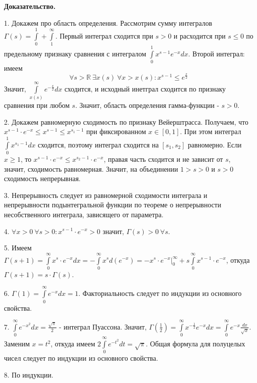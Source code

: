\textbf{Доказательство.}

1. Докажем про область определения. Рассмотрим сумму интегралов
$\Gamma(s)=\int\limits_{0}^{1}+\int\limits_{1}^{\infty}$. 
Первый интеграл сходится при $s>0$ и расходится при $s\leqslant 0$
по предельному признаку сравнения с интегралом
$\int\limits_{0}^{1}x^{s-1}e^{-x}dx$. Второй интеграл: имеем
$$\forall s>\mathbb{R}~\exists x(s)~\forall x>x(s):
x^{s-1}\leqslant e^{\frac{x}{2}}$$ 
Значит, $\int\limits_{x(s)}^{\infty}e^{-\frac{x}{2}}dx$ сходится, и исходный
инетграл сходится по признаку сравнения при любом $s$. Значит, область 
определения гамма-функции -  $s>0$.

2. Докажем равномерную сходимость по признаку Вейерштрасса. Получаем, что
$x^{s-1}\cdot e^{-x}\leqslant x^{s-1}\leqslant x^{s_1-1}$ при фиксированном
$x\in [0,1]$. При этом интеграл $\int\limits_{0}^{1}x^{s_1-1}dx$ сходится, 
поэтому интеграл сходится на $[s_1,s_2]$ равномерно. Если $x\geqslant 1$,
то $x^{s-1}\cdot e^{-x}\leqslant x^{s_2-1}\cdot e^{-x}$, правая часть 
сходится и не зависит от $s$, значит, сходимость равномерная. Значит,
на объединении $1>s>0$ и  $s>0$ сходимость непрерывная.

3. Непрерывность следует из равномерной сходимости интеграла и непрерывности
подынтегральной функции по теореме о непрерывности несобственного интеграла,
зависящего от параметра. 

4. $\forall x>0~\forall s>0:x^{s-1}\cdot e^{-x}>0$ значит, 
$\Gamma(s)>0~\forall s$.

5. Имеем $\Gamma(s+1)=\int\limits_{0}^{\infty}x^{s}\cdot e^{-x}dx=
-\int\limits_{0}^{\infty}x^sd(e^{-x})=-x^{s}\cdot e^{-x}\Big|^\infty_0+
s \int\limits_{0}^{\infty}x^{s-1}\cdot e^{-x}$, откуда $\Gamma(s+1)=
s\cdot \Gamma(s)$.

6. $\Gamma(1)=\int\limits_{0}^{\infty}e^{-x}dx=1$. Факториальность следует 
по индукции из основного свойства. 

7. $\int\limits_{0}^{\infty}e^{-x^2}dx=\frac{\sqrt{\pi} }{2}$ - интеграл 
Пуассона. Значит, $\Gamma(\frac{1}{2})=\int\limits_{0}^{\infty}x^{-\frac{1}{2}}
e^{-x}dx=\int\limits_{0}^{\infty}e^{-x}\frac{dx}{\sqrt{x}}$. Заменим 
$x=t^2$, откуда  имеем $2 \int\limits_{0}^{\infty}e^{-t^2}dt=\sqrt{\pi}$.
Общая формула для полуцелых чисел следует по индукции из основного свойства.

8. По индукции.


